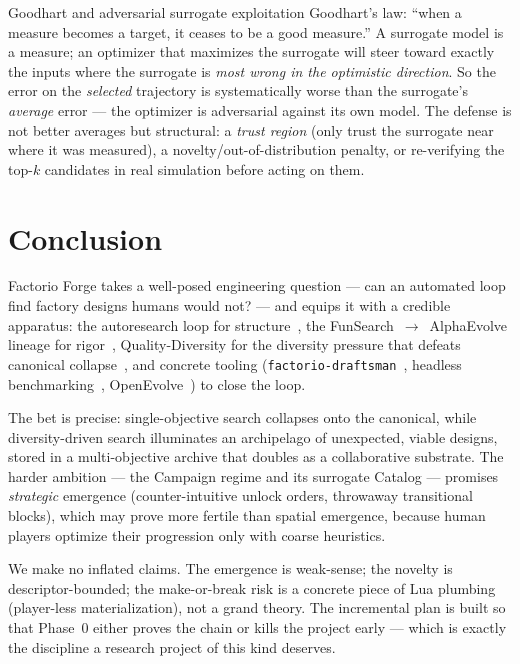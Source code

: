 \documentclass[11pt,a4paper]{article}
\begin{document}
\begin{notionbox}{Goodhart and adversarial surrogate exploitation}
\label{box:goodhart}
Goodhart's law: ``when a measure becomes a target, it ceases to be a good
measure.'' A surrogate model is a measure; an optimizer that maximizes the
surrogate will steer toward exactly the inputs where the surrogate is
\emph{most wrong in the optimistic direction}. So the error on the
\emph{selected} trajectory is systematically worse than the surrogate's
\emph{average} error --- the optimizer is adversarial against its own model. The
defense is not better averages but structural: a \emph{trust region} (only trust
the surrogate near where it was measured), a novelty/out-of-distribution penalty,
or re-verifying the top-$k$ candidates in real simulation before acting on them.
\end{notionbox}

\section{Conclusion}
\label{sec:conclusion}

Factorio Forge takes a well-posed engineering question --- can an automated loop
find factory designs humans would not? --- and equips it with a credible
apparatus: the autoresearch loop for structure~\cite{karpathy_autoresearch}, the
FunSearch~$\rightarrow$~AlphaEvolve lineage for rigor~\cite{alphaevolve_arxiv},
Quality-Diversity for the diversity pressure that defeats canonical
collapse~\cite{qd_reference}, and concrete tooling
(\texttt{factorio-draftsman}~\cite{draftsman_github},
headless benchmarking~\cite{mulark_benchmark}, OpenEvolve~\cite{openevolve}) to
close the loop.

The bet is precise: single-objective search collapses onto the canonical, while
diversity-driven search illuminates an archipelago of unexpected, viable designs,
stored in a multi-objective archive that doubles as a collaborative substrate.
The harder ambition --- the Campaign regime and its surrogate Catalog --- promises
\emph{strategic} emergence (counter-intuitive unlock orders, throwaway
transitional blocks), which may prove more fertile than spatial emergence,
because human players optimize their progression only with coarse heuristics.

We make no inflated claims. The emergence is weak-sense; the novelty is
descriptor-bounded; the make-or-break risk is a concrete piece of Lua plumbing
(player-less materialization), not a grand theory. The incremental plan is built
so that Phase~0 either proves the chain or kills the project early --- which is
exactly the discipline a research project of this kind deserves.

\newpage


\end{document}

